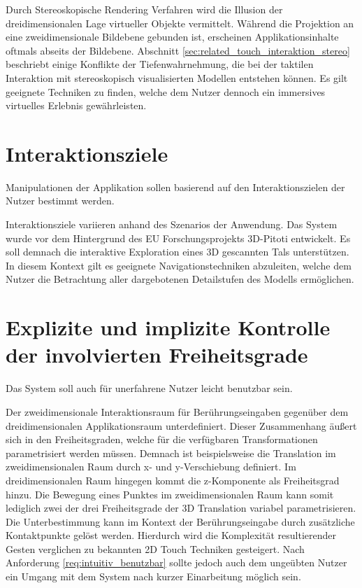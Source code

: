 Durch Stereoskopische Rendering Verfahren wird die Illusion der dreidimensionalen Lage virtueller Objekte vermittelt. Während die Projektion an eine zweidimensionale Bildebene gebunden ist, erscheinen Applikationsinhalte oftmals abseits der Bildebene. Abschnitt \ref{sec:related_touch_interaktion_stereo} beschriebt einige Konflikte der Tiefenwahrnehmung, die bei der taktilen Interaktion mit stereoskopisch visualisierten Modellen entstehen können. Es gilt geeignete Techniken zu finden, welche dem Nutzer dennoch ein immersives virtuelles Erlebnis gewährleisten.


\section{Interaktionsziele}
\label{sec:interaktionsziele}

	\begin{anforderung}
	\label{req:interaktionsziele}
		Manipulationen der Applikation sollen basierend auf den Interaktionszielen der Nutzer bestimmt werden.
	\end{anforderung}

Interaktionsziele variieren anhand des Szenarios der Anwendung. Das System wurde vor dem Hintergrund des EU Forschungsprojekts 3D-Pitoti entwickelt. Es soll demnach die interaktive Exploration eines 3D gescannten Tals unterstützen. In diesem Kontext gilt es geeignete Navigationstechniken abzuleiten, welche dem Nutzer die Betrachtung aller dargebotenen Detailstufen des Modells ermöglichen.


\section{Explizite und implizite Kontrolle der involvierten Freiheitsgrade}
\label{sec:kontrolle_der_freiheitsgrade}

	\begin{anforderung}
	\label{req:intuitiv_benutzbar}
		Das System soll auch für unerfahrene Nutzer leicht benutzbar sein.
	\end{anforderung}

Der zweidimensionale Interaktionsraum für Berührungseingaben gegenüber dem dreidimensionalen Applikationsraum unterdefiniert. Dieser Zusammenhang äußert sich in den Freiheitsgraden, welche für die verfügbaren Transformationen parametrisiert werden müssen. Demnach ist beispielsweise die Translation im zweidimensionalen Raum durch x- und y-Verschiebung definiert. Im dreidimensionalen Raum hingegen kommt die z-Komponente als Freiheitsgrad hinzu. Die Bewegung eines Punktes im zweidimensionalen Raum kann somit lediglich zwei der drei Freiheitsgrade der 3D Translation variabel parametrisieren. Die Unterbestimmung kann im Kontext der Berührungseingabe durch zusätzliche Kontaktpunkte gelöst werden. Hierdurch wird die Komplexität resultierender Gesten verglichen zu bekannten 2D Touch Techniken gesteigert. Nach Anforderung \ref{req:intuitiv_benutzbar} sollte jedoch auch dem ungeübten Nutzer ein Umgang mit dem System nach kurzer Einarbeitung möglich sein.

